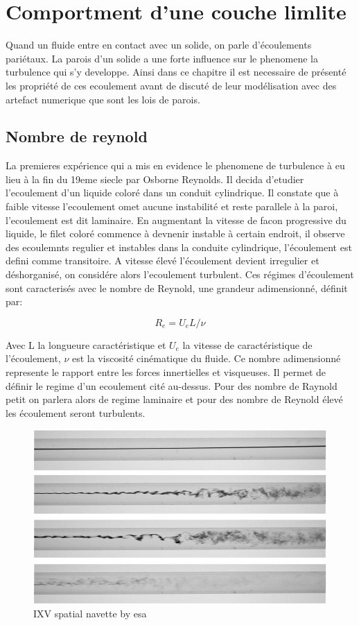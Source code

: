 \section{Comportment d'une couche limlite}

Quand un fluide entre en contact avec un solide, on parle d'écoulements pariétaux. La parois d'un solide a une forte influence sur le phenomene la turbulence qui s'y developpe. Ainsi dans ce chapitre il est necessaire de présenté les propriété de ces ecoulement avant de discuté de leur modélisation avec des artefact numerique que sont les lois de parois.

\subsection{Nombre de reynold}

La premieres expérience qui a mis en evidence le phenomene de turbulence à eu lieu à la fin du 19eme siecle par  Osborne Reynolds. Il decida d'etudier l'ecoulement d'un liquide coloré dans un conduit cylindrique. Il constate que à faible vitesse l'ecoulement omet aucune instabilité et reste parallele à la paroi, l'ecoulement est  dit laminaire. En augmentant la vitesse de facon progressive du liquide, le filet coloré commence à devnenir instable à certain endroit, il observe des ecoulemnts regulier et instables dans la conduite cylindrique, l'écoulement est defini comme transitoire. A vitesse élevé l'écoulement devient irregulier et déshorganisé, on considére alors l'ecoulement turbulent. Ces régimes d'écoulement sont caracterisés avec le nombre de Reynold, une grandeur adimensionné, définit par:

$$R_e=U_eL/\nu$$

Avec L la longueure caractéristique et $U_e$ la vitesse de caractéristique de l'écoulement, $\nu$ est la viscosité cinématique du fluide. Ce nombre adimensionné represente le rapport entre les forces innertielles et visqueuses. Il permet de définir le regime d'un ecoulement cité au-dessus. Pour des nombre de Raynold petit on parlera alors de regime laminaire et pour des nombre de Reynold élevé les écoulement seront turbulents.

\begin{figure}[!ht]
 \centering
 \includegraphics[width=0.7\linewidth]{chapter5_wall_models/pictures/reynold.png}
 \vspace{-2ex}
 \caption{IXV spatial navette by esa}
  \vspace{2ex}
 \label{chap1}
\end{figure}

